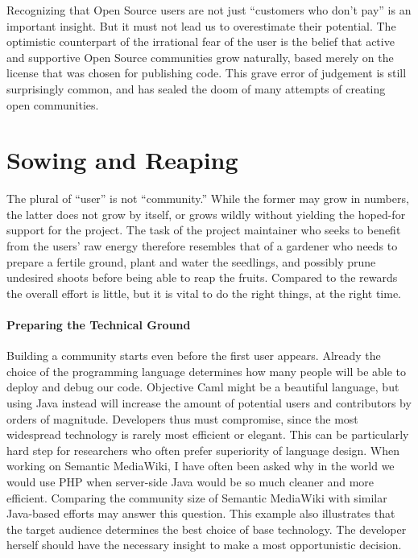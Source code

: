 Recognizing that Open Source users are not just ``customers who don't pay'' is
an important insight. But it must not lead us to overestimate their potential.
The optimistic counterpart of the irrational fear of the user is the belief that
active and supportive Open Source communities grow naturally, based merely on
the license that was chosen for publishing code. This grave error of judgement
is still surprisingly common, and has sealed the doom of many attempts of
creating open communities.

\section*{Sowing and Reaping}

The plural of ``user'' is not ``community.'' While the former may grow in
numbers, the latter does not grow by itself, or grows wildly without yielding
the hoped-for support for the project. The task of the project maintainer who
seeks to benefit from the users' raw energy therefore resembles that of a
gardener who needs to prepare a fertile ground, plant and water the seedlings,
and possibly prune undesired shoots before being able to reap the fruits.
Compared to the rewards the overall effort is little, but it is vital to do the
right things, at the right time.

\paragraph*{Preparing the Technical Ground}
Building a community starts even before the first user appears. Already the
choice of the programming language determines how many people will be able to
deploy and debug our code. Objective Caml might be a beautiful language, but
using Java instead will increase the amount of potential users and contributors
by orders of magnitude. Developers thus must compromise, since the most
widespread technology is rarely most efficient or elegant. This can be
particularly hard step for researchers who often prefer superiority of language
design. When working on Semantic MediaWiki, I have often been asked why in the
world we would use PHP when server-side Java would be so much cleaner and more
efficient. Comparing the community size of Semantic MediaWiki with similar
Java-based efforts may answer this question. This example also illustrates that
the target audience determines the best choice of base technology. The developer
herself should have the necessary insight to make a most opportunistic decision.

